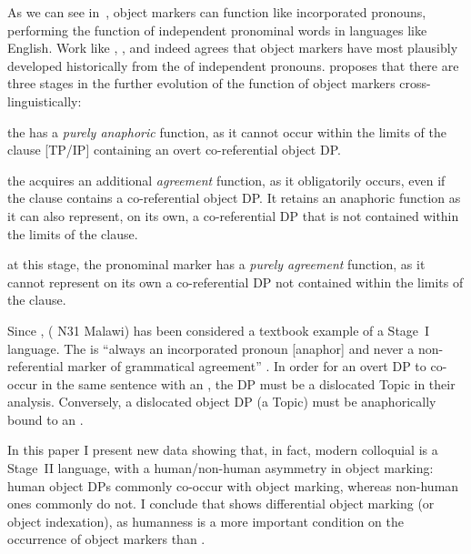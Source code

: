 \documentclass[output=paper]{LSP/langsci}
\begin{document}
As we can see in~, object markers can function like incorporated pronouns, performing the function of independent pronominal words in languages like English. 
Work like \citet{Givon1976Topic}, \citet{Bresnanetal1987Topic}, and \citet{Creissels2006Typology} indeed agrees that  object markers have most plausibly developed historically from the  of independent pronouns. 
\citet[44–45]{Creissels2006Typology} proposes that there are three stages in the further evolution of the function of object markers cross-linguistically:

\begin{exe}
\ex
\label{02-do-ex:2}%
\begin{description}[leftmargin=!, labelwidth=\widthof{Stage~III:}]
\item [Stage~II:] the  has a \textit{purely anaphoric} function, as it cannot occur within the limits of the clause [TP/IP] containing an overt co-referential object DP.
\item [Stage~II:] the  acquires an additional \textit{agreement} function, as it obligatorily occurs, even if the clause contains a co-referential object DP. It retains an anaphoric function as it can also represent, on its own, a co-referential DP that is not contained within the limits of the clause.
\item [Stage~III:] at this stage, the pronominal marker has a \textit{purely agreement} function, as it cannot represent on its own a co-referential DP not contained within the limits of the clause.
\end{description}
\end{exe}

Since \citet{Bresnanetal1987Topic},  ( N31 Malawi) has been considered a textbook example of a Stage~I language.
The  is “always an incorporated pronoun [anaphor] and never a non-referential marker of grammatical agreement” \citep[755]{Bresnanetal1987Topic}. 
In order for an overt DP to co-occur in the same sentence with an , the DP must be a dislocated Topic in their analysis. 
Conversely, a dislocated object DP (a Topic) must be anaphorically bound to an  \citep[749]{Bresnanetal1987Topic}.

In this paper I present new  data showing that, in fact, modern colloquial  is a Stage~II language, with a human/non-human asymmetry in object marking: human object DPs commonly co-occur with object marking, whereas non-human ones commonly do not. 
I conclude that  shows differential object marking (or object indexation), as humanness is a more important condition on the occurrence of object markers than .
\end{document}
